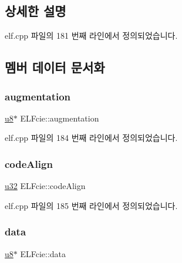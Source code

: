 \subsection{상세한 설명}


elf.\+cpp 파일의 181 번째 라인에서 정의되었습니다.



\subsection{멤버 데이터 문서화}
\mbox{\label{struct_e_l_fcie_a181b83638e92b83dfc39c641ac71557b}} 
\subsubsection{\texorpdfstring{augmentation}{augmentation}}
{\footnotesize\ttfamily \mbox{\hyperlink{_system_8h_aed742c436da53c1080638ce6ef7d13de}{u8}}$\ast$ E\+L\+Fcie\+::augmentation}



elf.\+cpp 파일의 184 번째 라인에서 정의되었습니다.

\mbox{\label{struct_e_l_fcie_aec7907fb3c0c13aeba624a1dea3e14ca}} 
\subsubsection{\texorpdfstring{code\+Align}{codeAlign}}
{\footnotesize\ttfamily \mbox{\hyperlink{_system_8h_a10e94b422ef0c20dcdec20d31a1f5049}{u32}} E\+L\+Fcie\+::code\+Align}



elf.\+cpp 파일의 185 번째 라인에서 정의되었습니다.

\mbox{\label{struct_e_l_fcie_a24ea835dfe2a5089b098aae27a6de0d8}} 
\subsubsection{\texorpdfstring{data}{data}}
{\footnotesize\ttfamily \mbox{\hyperlink{_system_8h_aed742c436da53c1080638ce6ef7d13de}{u8}}$\ast$ E\+L\+Fcie\+::data}



